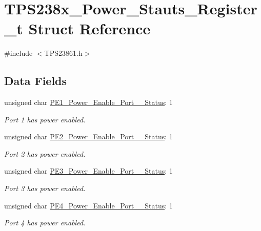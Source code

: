 \hypertarget{struct_t_p_s238x___power___stauts___register__t}{\section{T\-P\-S238x\-\_\-\-Power\-\_\-\-Stauts\-\_\-\-Register\-\_\-t Struct Reference}
\label{struct_t_p_s238x___power___stauts___register__t}
}


{\ttfamily \#include $<$T\-P\-S23861.\-h$>$}

\subsection*{Data Fields}
\begin{DoxyCompactItemize}
\item 
unsigned char \hyperlink{struct_t_p_s238x___power___stauts___register__t_a6f3c7e594685c77b574357445f71346d}{P\-E1\-\_\-\-Power\-\_\-\-Enable\-\_\-\-Port\-\_\-\_\-\-Status}\-: 1
\begin{DoxyCompactList}\small\item\em Port 1 has power enabled. \end{DoxyCompactList}\item 
unsigned char \hyperlink{struct_t_p_s238x___power___stauts___register__t_aca4b4d5f38c03d86cda3f05626f12818}{P\-E2\-\_\-\-Power\-\_\-\-Enable\-\_\-\-Port\-\_\-\_\-\-Status}\-: 1
\begin{DoxyCompactList}\small\item\em Port 2 has power enabled. \end{DoxyCompactList}\item 
unsigned char \hyperlink{struct_t_p_s238x___power___stauts___register__t_a216e4575a70e0af53bb0e16857147f66}{P\-E3\-\_\-\-Power\-\_\-\-Enable\-\_\-\-Port\-\_\-\_\-\-Status}\-: 1
\begin{DoxyCompactList}\small\item\em Port 3 has power enabled. \end{DoxyCompactList}\item 
unsigned char \hyperlink{struct_t_p_s238x___power___stauts___register__t_a34ab6a8aba08405ec0c0bfd15a419746}{P\-E4\-\_\-\-Power\-\_\-\-Enable\-\_\-\-Port\-\_\-\_\-\-Status}\-: 1
\begin{DoxyCompactList}\small\item\em Port 4 has power enabled. \end{DoxyCompactList}\item 

\end{DoxyCompactItemize}
